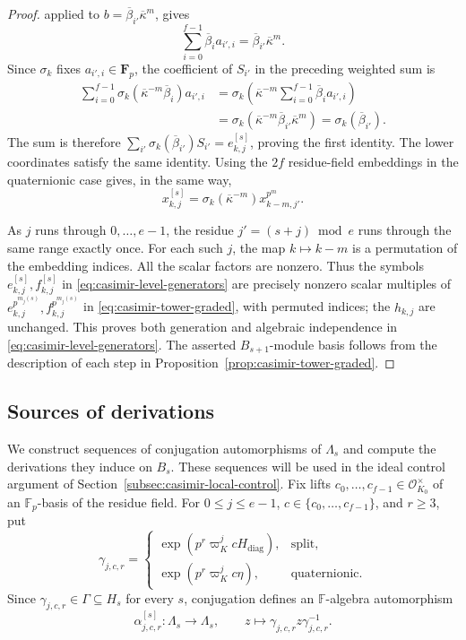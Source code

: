 \documentclass[11pt]{article}
\numberwithin{equation}{section}
\theoremstyle{definition}
\theoremstyle{remark}
\newcommand{\F}{\mathbb F}
\newcommand{\cO}{\mathcal O}
\begin{document}
\begin{proof}
applied to $b=\overline\beta_{i'}\overline\kappa^m$, gives
\[
 \sum_{i=0}^{f-1}\overline\beta_i a_{i',i}
   =\overline\beta_{i'}\overline\kappa^m.
\]
Since $\sigma_k$ fixes $a_{i',i}\in\mathbf F_p$, the coefficient
of $S_{i'}$ in the preceding weighted sum is
\[
 \begin{aligned}
 \sum_{i=0}^{f-1}
   \sigma_k(\overline\kappa^{-m}\overline\beta_i)a_{i',i}
 &=\sigma_k\left(\overline\kappa^{-m}
                  \sum_{i=0}^{f-1}\overline\beta_i a_{i',i}\right)\\
 &=\sigma_k(\overline\kappa^{-m}
             \overline\beta_{i'}\overline\kappa^m)
  =\sigma_k(\overline\beta_{i'}).
 \end{aligned}
\]
The sum is therefore $\sum_{i'}\sigma_k(\overline\beta_{i'})S_{i'}
=e_{k,j}^{[s]}$, proving the first identity.
The lower coordinates satisfy the same identity.
Using the $2f$ residue-field embeddings in the quaternionic case
gives, in the same way,
\[
 x_{k,j}^{[s]}=\sigma_k(\overline\kappa^{-m})x_{k-m,j'}^{p^m}.
\]

As $j$ runs through $0,\ldots,e-1$, the residue $j'=(s+j)\bmod e$
runs through the same range exactly once. For each such $j$, the
map $k\mapsto k-m$ is a permutation of the
embedding indices. All the scalar factors are nonzero.
Thus the symbols $e_{k,j}^{[s]},f_{k,j}^{[s]}$ in
\eqref{eq:casimir-level-generators} are precisely nonzero scalar multiples
of $e_{k,j}^{p^{m_j(s)}},f_{k,j}^{p^{m_j(s)}}$ in
\eqref{eq:casimir-tower-graded}, with permuted indices; the
$h_{k,j}$ are unchanged. This proves both generation and algebraic
independence in \eqref{eq:casimir-level-generators}.
The asserted $B_{s+1}$-module basis follows from the description
of each step in Proposition~\ref{prop:casimir-tower-graded}.
\end{proof}

\subsection{Sources of derivations}\label{subsec:casimir-sources}

We construct sequences of conjugation automorphisms of $\Lambda_s$
and compute the derivations they induce on $B_s$. These sequences
will be used in the ideal control argument of
Section~\ref{subsec:casimir-local-control}.
Fix lifts $c_0,\ldots,c_{f-1}\in\cO_{K_0}^{\times}$ of an
$\F_p$-basis of the residue field. For $0\leq j\leq e-1$,
$c\in\{c_0,\ldots,c_{f-1}\}$, and $r\geq3$, put
\[
 \gamma_{j,c,r}=
 \begin{cases}
 \exp(p^r\varpi_K^j cH_{\mathrm{diag}}),&\text{split},\\
 \exp(p^r\varpi_K^j c\eta),&\text{quaternionic}.
 \end{cases}
\]
Since $\gamma_{j,c,r}\in\Gamma\subseteq H_s$ for every $s$,
conjugation defines an $\F$-algebra automorphism
\[
 \alpha^{[s]}_{j,c,r}:\Lambda_s\longrightarrow\Lambda_s,
 \qquad z\longmapsto\gamma_{j,c,r}z\gamma_{j,c,r}^{-1}.
\]
\end{document}
